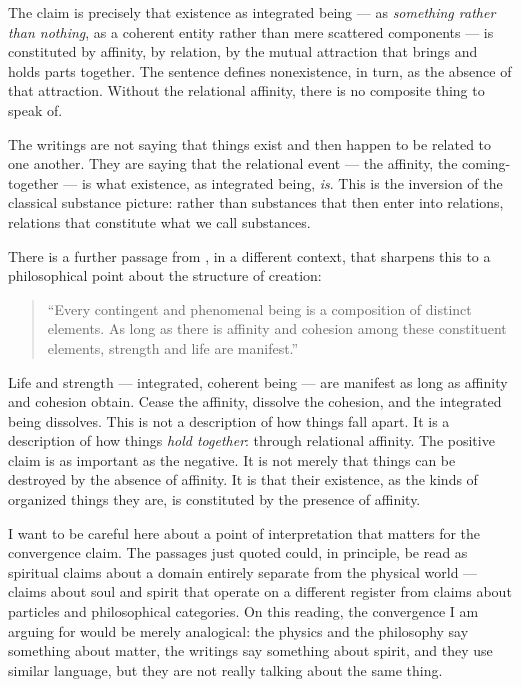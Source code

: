 The claim is precisely that existence as integrated being --- as \emph{something rather than nothing}, as a coherent entity rather than mere scattered components --- is constituted by affinity, by relation, by the mutual attraction that brings and holds parts together. The sentence defines nonexistence, in turn, as the absence of that attraction. Without the relational affinity, there is no composite thing to speak of.

The writings are not saying that things exist and then happen to be related to one another. They are saying that the relational event --- the affinity, the coming-together --- is what existence, as integrated being, \emph{is}. This is the inversion of the classical substance picture: rather than substances that then enter into relations, relations that constitute what we call substances.

There is a further passage from \AbdulBaha, in a different context, that sharpens this to a philosophical point about the structure of creation:

\begin{quote}
``Every contingent and phenomenal being is a composition of distinct elements. As long as there is affinity and cohesion among these constituent elements, strength and life are manifest.''
\citep[Talk 41]{PUP}
\end{quote}

Life and strength --- integrated, coherent being --- are manifest as long as affinity and cohesion obtain. Cease the affinity, dissolve the cohesion, and the integrated being dissolves. This is not a description of how things fall apart. It is a description of how things \emph{hold together}: through relational affinity. The positive claim is as important as the negative. It is not merely that things can be destroyed by the absence of affinity. It is that their existence, as the kinds of organized things they are, is constituted by the presence of affinity.

I want to be careful here about a point of interpretation that matters for the convergence claim. The \bahai passages just quoted could, in principle, be read as spiritual claims about a domain entirely separate from the physical world --- claims about soul and spirit that operate on a different register from claims about particles and philosophical categories. On this reading, the convergence I am arguing for would be merely analogical: the physics and the philosophy say something about matter, the writings say something about spirit, and they use similar language, but they are not really talking about the same thing.

